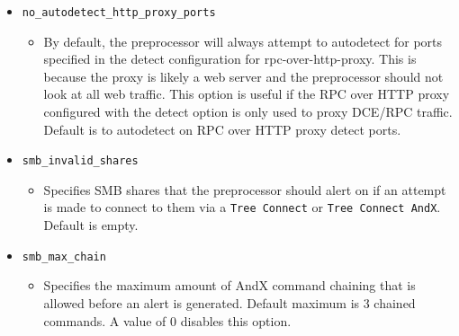 \documentclass[english]{report}
\begin{document}
\begin{itemize}
\begin{itemize}
\end{itemize}

\item[] \texttt{no\_autodetect\_http\_proxy\_ports}

\begin{itemize}

\item[] By default, the preprocessor will always attempt to autodetect for
ports specified in the detect configuration for rpc-over-http-proxy.  This is
because the proxy is likely a web server and the preprocessor should not look
at all web traffic. This option is useful if the RPC over HTTP proxy configured
with the detect option is only used to proxy DCE/RPC traffic.  Default is to
autodetect on RPC over HTTP proxy detect ports.

\end{itemize}

\item[] \texttt{smb\_invalid\_shares}

\begin{itemize}

\item[] Specifies SMB shares that the preprocessor should alert on if an
attempt is made to connect to them via a \texttt{Tree Connect} or \texttt{Tree
Connect AndX}.  Default is empty.

\end{itemize}

\item[] \texttt{smb\_max\_chain}

\begin{itemize}

\item[] Specifies the maximum amount of AndX command chaining that is allowed
before an alert is generated.  Default maximum is 3 chained commands.  A value
of 0 disables this option.

\end{itemize}
\end{itemize}
\end{document}
